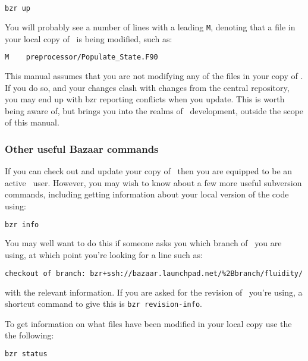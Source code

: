 \begin{lstlisting}[language=Bash]
bzr up
\end{lstlisting}

You will probably see a number of lines with a leading
\lstinline[language=Bash]+M+, denoting that a file in your local copy of
\fluidity\ is being modified, such as:

\begin{lstlisting}[language=Bash]
M    preprocessor/Populate_State.F90
\end{lstlisting}

This manual assumes that you are not modifying any of the files in your copy of
\fluidity. If you do so, and your changes clash with changes from the central
repository, you may end up with bzr reporting conflicts when you update. This
is worth being aware of, but brings you into the realms of \fluidity\
development, outside the scope of this manual.

\subsubsection{Other useful Bazaar commands}
\label{sec:subversion_extras}

If you can check out and update your copy of \fluidity\ then you are equipped to
be an active \fluidity\ user. However, you may wish to know about a few more
useful subversion commands, including getting information about your local
version of the code using:

\begin{lstlisting}[language=Bash]
bzr info
\end{lstlisting}

You may well want to do this if someone asks you which branch of \fluidity\ you
are using, at which point you're looking for a line such as:

\begin{lstlisting}[language=Bash]
checkout of branch: bzr+ssh://bazaar.launchpad.net/%2Bbranch/fluidity/
\end{lstlisting}

with the relevant information. If you are asked for the revision of
\fluidity\ you're using, a shortcut command to give this is
\lstinline[language=Bash]+bzr revision-info+.

To get information on what files have been modified in your
local copy use the the following:
\begin{lstlisting}[language=Bash]
bzr status
\end{lstlisting}

